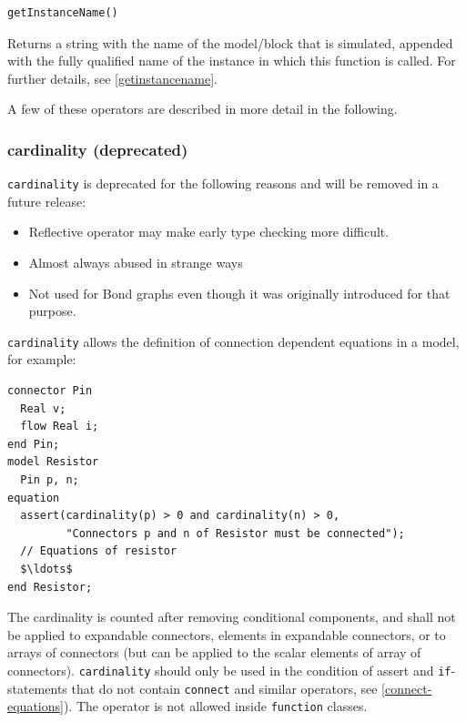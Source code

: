 \begin{operatordefinition}[getInstanceName]
\begin{synopsis}\begin{lstlisting}
getInstanceName()
\end{lstlisting}\end{synopsis}
\begin{semantics}
Returns a string with the name of the model/block that is simulated, appended with the fully qualified name of the instance in which this function is called.
For further details, see \cref{getinstancename}.
\end{semantics}
\end{operatordefinition}

A few of these operators are described in more detail in the following.


\subsubsection{cardinality (deprecated)}\label{cardinality-deprecated}

\begin{nonnormative}
\lstinline!cardinality! is deprecated for the following reasons and will be removed in a future release:
\begin{itemize}
\item
  Reflective operator may make early type checking more difficult.
\item
  Almost always abused in strange ways
\item
  Not used for Bond graphs even though it was originally introduced for that purpose.
\end{itemize}
\end{nonnormative}

\begin{nonnormative}
\lstinline!cardinality! allows the definition of connection dependent equations in a model, for example:
\begin{lstlisting}[language=modelica]
connector Pin
  Real v;
  flow Real i;
end Pin;
model Resistor
  Pin p, n;
equation
  assert(cardinality(p) > 0 and cardinality(n) > 0,
         "Connectors p and n of Resistor must be connected");
  // Equations of resistor
  $\ldots$
end Resistor;
\end{lstlisting}
\end{nonnormative}

The cardinality is counted after removing conditional components, and shall not be applied to expandable connectors, elements in expandable connectors, or to arrays of connectors (but can be applied to the scalar elements of array of connectors).
\lstinline!cardinality! should only be used in the condition of assert and \lstinline!if!-statements that do not contain \lstinline!connect! and similar operators, see \cref{connect-equations}).
The operator is not allowed inside \lstinline!function! classes.


